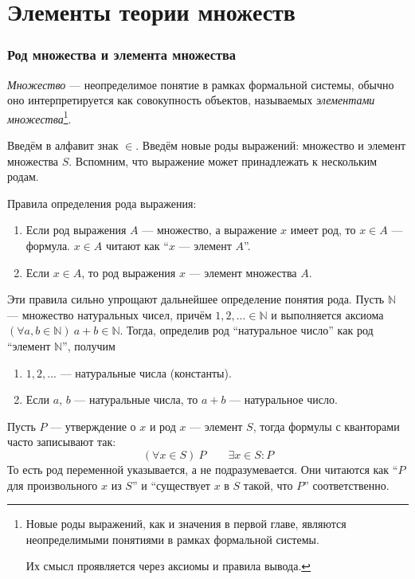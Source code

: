 \part{Элементы теории множеств}

\section{Род множества и элемента множества}

 {\it Множество} --- неопределимое понятие в рамках формальной системы,
обычно оно интерпретируется как совокупность объектов,
называемых {\it элементами множества}\footnote{
	Новые роды выражений, как и значения в первой главе,
	являются неопределимыми понятиями в рамках
	формальной системы.

	Их смысл проявляется через аксиомы и правила вывода.
}.

Введём в алфавит знак $\in$.
Введём новые роды выражений: множество и элемент множества $S$.
Вспомним, что выражение может принадлежать к нескольким родам.

Правила определения рода выражения:
\begin{enumerate}
	\item{}Если род выражения $A$ --- множество, а выражение $x$
	имеет род, то $x\in A$ --- формула.
	$x\in A$ читают как ``$x$ --- элемент $A$''.
	\item{}Если $x\in A$, то род выражения $x$ --- элемент множества $A$.
\end{enumerate}

\newcommand\N{\mathbb N}
Эти правила сильно упрощают дальнейшее определение понятия рода.
Пусть $\N$ --- множество
натуральных чисел, причём $1,2,...\in\N$ и выполняется
аксиома $(\forall a,b\in\N)~a+b\in\N$.
Тогда, определив род ``натуральное число'' как род ``элемент $\N$'', получим
\begin{enumerate}
	\item{}$1,2,...$ --- натуральные числа (константы).
	\item{}Если $a$, $b$ --- натуральные числа, то $a+b$ --- натуральное число.
\end{enumerate}

Пусть $P$ --- утверждение о $x$ и род $x$ --- элемент $S$, тогда
формулы с кванторами часто записывают так:
\[
	(\forall x\in S)~P\qquad \exists x\in S:P
\]
То есть род переменной указывается, а не подразумевается.
Они читаются как ``$P$ для произвольного $x$ из $S$'' и
``существует $x$ в $S$ такой, что $P$'' соответственно.

